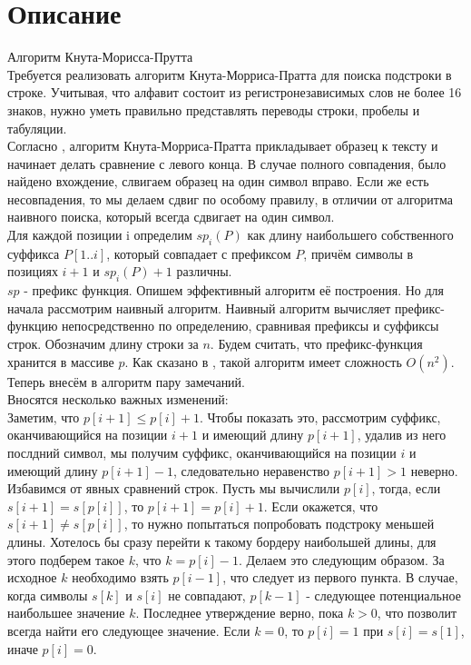 \section{Описание}
Алгоритм Кнута-Морисса-Прутта 
\\Требуется реализовать алгоритм Кнута-Морриса-Пратта для поиска 
подстроки в строке. Учитывая, что алфавит состоит из регистронезависимых слов не более
16 знаков, нужно уметь правильно представлять переводы строки, пробелы и табуляции.
\\ Согласно \cite{Gusfield}, алгоритм Кнута-Морриса-Пратта прикладывает образец к тексту и начинает делать сравнение
с левого конца. В случае полного совпадения, было найдено вхождение, слвигаем образец на один символ вправо. Если же есть
несовпадения, то мы делаем сдвиг по особому правилу, в отличии от алгоритма наивного поиска, который всегда сдвигает на 
один символ.
\\Для каждой позиции i определим $sp_i(P)$ как длину наибольшего собственного суффикса $P[1..i]$, который совпадает с префиксом
$P$, причём символы в позициях $i+1$ и $sp_i(P) + 1$ различны.
\\$sp$ - префикс функция. Опишем эффективный алгоритм её построения. Но для начала рассмотрим наивный алгоритм. Наивный алгоритм вычисляет префикс-функцию непосредственно по определению, сравнивая префиксы и суффиксы строк. 
Обозначим длину строки за $n$. Будем считать, что префикс-функция хранится в массиве $p$. Как сказано в \cite{Algo}, такой алгоритм имеет сложность $O(n^2)$. Теперь внесём в алгоритм пару замечаний.
\\Вносятся несколько важных изменений:
\\Заметим, что $p[i + 1] \leq p[i] + 1$. Чтобы показать это, рассмотрим суффикс, оканчивающийся на позиции $i + 1$ и имеющий длину $p[i + 1]$, удалив из него послдний символ, мы получим суффикс, оканчивающийся на позиции $i$
и имеющий длину $p[i + 1] - 1$, следовательно неравенство $p[i + 1] > 1$ неверно.
\\Избавимся от явных сравнений строк. Пусть мы вычислили $p[i]$, тогда, если $s[i + 1] = s[p[i]]$, то $p[i + 1] = p[i] + 1$. Если окажется, что $s[i+1] \neq s[p[i]]$, то нужно попытаться попробовать подстроку меньшей длины.
Хотелось бы сразу перейти к такому бордеру наибольшей длины, для этого подберем такое $k$, что $k=p[i] - 1$. Делаем это следующим образом. За исходное $k$ необходимо взять $p[i - 1]$, что следует из первого пункта. В случае,
когда символы $s[k]$ и $s[i]$ не совпадают, $p[k-1]$ - следующее потенциальное наибольшее значение $k$. Последнее утверждение верно, пока $k > 0$, что позволит всегда найти его следующее значение. Если $k = 0$, то $p[i] = 1$ при
$s[i] = s[1]$, иначе $p[i] = 0$.


